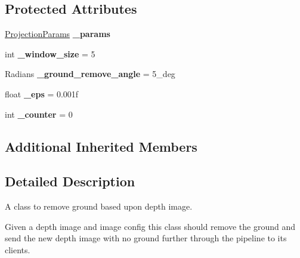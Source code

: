 \subsection*{Protected Attributes}
\begin{DoxyCompactItemize}
\item 
\hypertarget{classdepth__clustering_1_1DepthGroundRemover_ad4ff83331f7ad6a3bbb22ce5356471ed}{\hyperlink{classdepth__clustering_1_1ProjectionParams}{Projection\-Params} {\bfseries \-\_\-params}}\label{classdepth__clustering_1_1DepthGroundRemover_ad4ff83331f7ad6a3bbb22ce5356471ed}

\item 
\hypertarget{classdepth__clustering_1_1DepthGroundRemover_a44a1a7778c4913540c9fd3545671ee96}{int {\bfseries \-\_\-window\-\_\-size} = 5}\label{classdepth__clustering_1_1DepthGroundRemover_a44a1a7778c4913540c9fd3545671ee96}

\item 
\hypertarget{classdepth__clustering_1_1DepthGroundRemover_a6acd966842064c50552cfd3857652cd8}{Radians {\bfseries \-\_\-ground\-\_\-remove\-\_\-angle} = 5\-\_\-deg}\label{classdepth__clustering_1_1DepthGroundRemover_a6acd966842064c50552cfd3857652cd8}

\item 
\hypertarget{classdepth__clustering_1_1DepthGroundRemover_a1d27a305647b5315b1c2a46c4b0a3039}{float {\bfseries \-\_\-eps} = 0.\-001f}\label{classdepth__clustering_1_1DepthGroundRemover_a1d27a305647b5315b1c2a46c4b0a3039}

\item 
\hypertarget{classdepth__clustering_1_1DepthGroundRemover_a5230ebdee643d0e76c86486adf70db5d}{int {\bfseries \-\_\-counter} = 0}\label{classdepth__clustering_1_1DepthGroundRemover_a5230ebdee643d0e76c86486adf70db5d}

\end{DoxyCompactItemize}
\subsection*{Additional Inherited Members}


\subsection{Detailed Description}
A class to remove ground based upon depth image. 

Given a depth image and image config this class should remove the ground and send the new depth image with no ground further through the pipeline to its clients.


